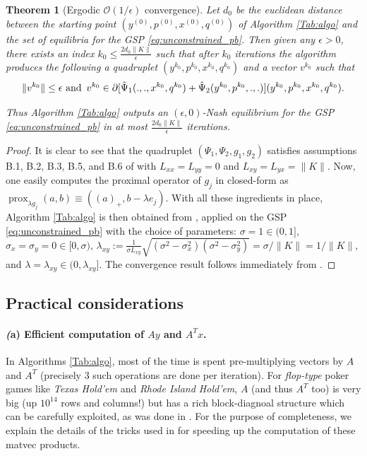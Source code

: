 \documentclass{article} %
\newtheorem{theorem}{Theorem} \newtheorem{lemma}[theorem]{Lemma}
\DeclareMathOperator{\prox}{prox}
\begin{document}
\begin{theorem}[Ergodic $\mathcal{O}(1/\epsilon)$ convergence]
Let $d_0$ be the euclidean distance between the starting point
$(y^{(0)},p^{(0)},x^{(0)},q^{(0)})$ of Algorithm \ref{Tab:algo} and the
set of equilibria for the GSP \eqref{eq:unconstrained_pb}.
Then given any $\epsilon > 0$, there exists an index
$k_0 \le \frac{2d_0\|K\|}{\epsilon}$ such that after $k_0$ iterations
the algorithm produces the following a quadruplet
$(y^{k_0},p^{k_0},x^{k_0},q^{k_0})$ and a vector $v^{k_0}$ such that
\begin{eqnarray}
\|v^{k_0}\| \le \epsilon \text{ and}\hspace{.5em} v^{k_0} \in
\partial[\hat{\Psi}_1(., ., x^{k_0}, q^{k_0}) +
  \hat{\Psi}_2(y^{k_0}, p^{k_0}, ., .)](y^{k_0},p^{k_0},x^{k_0},q^{k_0}).
\end{eqnarray}

Thus Algorithm \ref{Tab:algo} outputs an $(\epsilon,0)$-Nash
equilibrium for the GSP \eqref{eq:unconstrained_pb}
in at most $\frac{2d_0\|K\|}{\epsilon}$ iterations.
\end{theorem}

\begin{proof}
It is clear to see that the quadruplet $(\Psi_1, \Psi_2, g_1, g_2)$
satisfies assumptions B.1, B.2, B.3, B.5, and B.6 of
\cite{he2013accelerating} with $L_{xx} = L_{yy} = 0$ and $L_{xy} =
L_{yx} = \|K\|$. Now, one easily computes the proximal operator of
$g_j$ in closed-form as $\prox_{\lambda g_j}(a, b) \equiv ((a)_+,
b - \lambda e_j)$. With all these ingredients in place, Algorithm
\ref{Tab:algo} is then obtained from \cite[Algorithm
  T-BD]{he2013accelerating}, applied on the GSP
\eqref{eq:unconstrained_pb} with the choice of parameters: $\sigma = 1
\in (0, 1]$, $\sigma_x = \sigma_y = 0 \in [0, \sigma)$,
    $\lambda_{xy} := \frac{1}{\sigma L_{xy}}\sqrt{(\sigma^2 -
        \sigma_x^2)(\sigma^2 - \sigma_y^2)} = \sigma / \|K\| =
      1/\|K\|$, and $\lambda = \lambda_{xy} \in (0,
      \lambda_{xy}]$. The convergence result follows immediately from
  \cite[Theorem 4.2]{he2013accelerating}.
\end{proof}

\subsection{Practical considerations}
\paragraph{\textbf{\textit(a) Efficient computation of $Ay$ and $A^Tx$.}}
In Algorithms \ref{Tab:algo}, most of the time is spent
pre-multiplying vectors by $A$ and $A^T$ (precisely 3 such operations
are done per iteration). For \textit{flop-type} poker
games like \textit{Texas Hold'em} and  \textit{Rhode Island Hold'em},
$A$ (and thus $A^T$ too)  is very big (up $10^{14}$ rows and columns!)
but has a rich block-diagnoal structure which can be carefully
exploited, as was done in \cite{hoda2010smoothing}. For the purpose of
completeness, we explain the details of the tricks used in
\cite{hoda2010smoothing} for speeding up the computation of these
matvec products.
\end{document}
